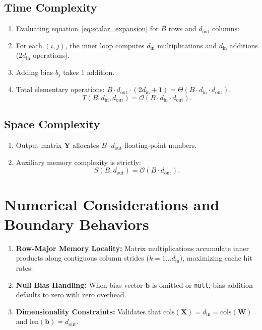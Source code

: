 \documentclass[11pt]{article}
\begin{document}
\subsection{Time Complexity}
\begin{enumerate}
    \item Evaluating equation~\eqref{eq:scalar_expansion} for $B$ rows and $d_{\text{out}}$ columns:
    \item For each $(i, j)$, the inner loop computes $d_{\text{in}}$ multiplications and $d_{\text{in}}$ additions ($2 d_{\text{in}}$ operations).
    \item Adding bias $b_j$ takes $1$ addition.
    \item Total elementary operations: $B \cdot d_{\text{out}} \cdot (2 d_{\text{in}} + 1) = \Theta(B \cdot d_{\text{in}} \cdot d_{\text{out}})$.
    \begin{equation}
    T(B, d_{\text{in}}, d_{\text{out}}) = \mathcal{O}(B \cdot d_{\text{in}} \cdot d_{\text{out}}).
    \end{equation}
\end{enumerate}

\subsection{Space Complexity}
\begin{enumerate}
    \item Output matrix $\mathbf{Y}$ allocates $B \cdot d_{\text{out}}$ floating-point numbers.
    \item Auxiliary memory complexity is strictly:
    \begin{equation}
    S(B, d_{\text{out}}) = \mathcal{O}(B \cdot d_{\text{out}}).
    \end{equation}
\end{enumerate}

\section{Numerical Considerations and Boundary Behaviors}
\label{sec:numerical}

\begin{enumerate}
    \item \textbf{Row-Major Memory Locality:} Matrix multiplications accumulate inner products along contiguous column strides ($k = 1 \dots d_{\text{in}}$), maximizing cache hit rates.
    \item \textbf{Null Bias Handling:} When bias vector $\mathbf{b}$ is omitted or \texttt{null}, bias addition defaults to zero with zero overhead.
    \item \textbf{Dimensionality Constraints:} Validates that $\text{cols}(\mathbf{X}) = d_{\text{in}} = \text{cols}(\mathbf{W})$ and $\text{len}(\mathbf{b}) = d_{\text{out}}$.
\end{enumerate}
\end{document}
